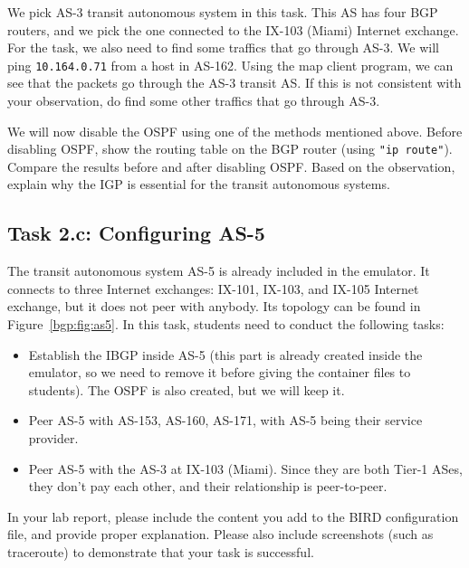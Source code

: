 We pick AS-3 transit autonomous system in this 
task. This AS has four BGP routers, and we pick the one 
connected to the IX-103 (Miami) Internet exchange.
For the task, we also need to find some traffics that 
go through AS-3. 
We will ping \texttt{10.164.0.71} from a host in AS-162. Using the 
map client program, we can see that the packets go through
the AS-3 transit AS. If this is not consistent with your observation,
do find some other traffics that go through AS-3. 


We will now disable the OSPF using one of the methods mentioned above.
Before disabling OSPF, show the routing table 
on the BGP router (using \texttt{"ip route"}). Compare the 
results before and after disabling OSPF. Based on the 
observation, explain why the IGP is essential for the transit 
autonomous systems. 


\subsection{Task 2.c: Configuring AS-5} 

The transit autonomous system AS-5 is already included in the emulator. 
It connects to three 
Internet exchanges: IX-101, IX-103, and IX-105 Internet exchange,
but it does not peer with anybody. Its topology can be found 
in Figure~\ref{bgp:fig:as5}.
In this task, students need to conduct the following tasks:

\begin{itemize}
  \item Establish the IBGP inside AS-5 (this part is already created 
    inside the emulator, so we need to remove it before giving the container 
    files to students). The OSPF is also created, but we will keep it. 

  \item Peer AS-5 with AS-153, AS-160, AS-171, with AS-5 being their service provider.

  \item Peer AS-5 with the AS-3 at IX-103 (Miami). Since they are both Tier-1 ASes,
    they don't pay each other, and their relationship is peer-to-peer.
\end{itemize}


In your lab report, please include the content you add to the 
BIRD configuration file, and provide proper explanation.
Please also include screenshots (such as traceroute) to demonstrate 
that your task is successful. 


